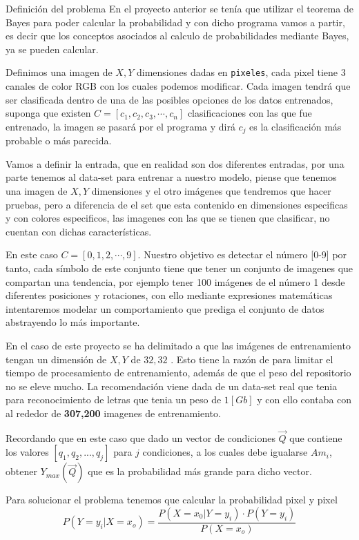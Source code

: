 \documentclass[
  spanish,
  ignorenonframetext,
]{beamer}
\begin{document}
\begin{frame}[fragile]{Definición del problema}
\protect\hypertarget{definiciuxf3n-del-problema}{}
En el proyecto anterior se tenía que utilizar el teorema de Bayes para
poder calcular la probabilidad y con dicho programa vamos a partir, es
decir que los conceptos asociados al calculo de probabilidades mediante
Bayes, ya se pueden calcular.

Definimos una imagen de \(X,Y\) dimensiones dadas en \texttt{pixeles},
cada pixel tiene 3 canales de color RGB con los cuales podemos
modificar. Cada imagen tendrá que ser clasificada dentro de una de las
posibles opciones de los datos entrenados, suponga que existen
\(C=[c_1,c_2,c_3, \cdots,c_n]\) clasificaciones con las que fue
entrenado, la imagen se pasará por el programa y dirá \(c_j\) es la
clasificación más probable o más parecida.

Vamos a definir la entrada, que en realidad son dos diferentes entradas,
por una parte tenemos al data-set para entrenar a nuestro modelo, piense
que tenemos una imagen de \(X,Y\) dimensiones y el otro imágenes que
tendremos que hacer pruebas, pero a diferencia de el set que esta
contenido en dimensiones especificas y con colores especificos, las
imagenes con las que se tienen que clasificar, no cuentan con dichas
características.

En este caso \(C=[0,1,2, \cdots,9]\)\hspace{0pt}. Nuestro objetivo es
detectar el número {[}0-9{]} por tanto, cada símbolo de este conjunto
tiene que tener un conjunto de imagenes que compartan una tendencia, por
ejemplo tener 100 imágenes de el número 1 desde diferentes posiciones y
rotaciones, con ello mediante expresiones matemáticas intentaremos
modelar un comportamiento que prediga el conjunto de datos abstrayendo
lo más importante.

En el caso de este proyecto se ha delimitado a que las imágenes de
entrenamiento tengan un dimensión de \(X,Y\) de \(32,32\) . Esto tiene
la razón de para limitar el tiempo de procesamiento de entrenamiento,
además de que el peso del repositorio no se eleve mucho. La
recomendación viene dada de un data-set real que tenia para
reconocimiento de letras que tenia un peso de \(1[Gb]\) y con ello
contaba con al rededor de \textbf{307,200} imagenes de entrenamiento.

Recordando que en este caso que dado un vector de condiciones
\(\vec{Q}\) que contiene los valores \([q_1,q_2,...,q_j]\) para \(j\)
condiciones, a los cuales debe igualarse \(Am_i\), obtener
\(Y_{max}(\vec{Q})\) que es la probabilidad más grande para dicho
vector.

Para solucionar el problema tenemos que calcular la probabilidad pixel y
pixel \[
P(Y=y_i|X=x_o)= \frac{P(X=x_0| Y=y_i)\cdot P(Y=y_i)}{P(X=x_o)}
\]
\end{frame}
\end{document}
